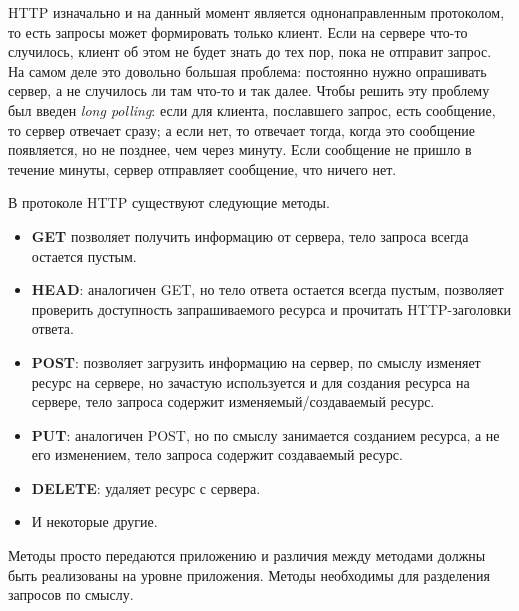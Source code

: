 HTTP изначально и на данный момент является однонаправленным протоколом, то есть запросы может формировать только клиент. Если на сервере что-то случилось, клиент об этом не будет знать до тех пор, пока не отправит запрос. На самом деле это довольно большая проблема: постоянно нужно опрашивать сервер, а не случилось ли там что-то и так далее.
Чтобы решить эту проблему был введен \emph{long polling}: если для клиента, пославшего запрос, есть сообщение, то сервер отвечает сразу; а если нет, то отвечает тогда, когда это сообщение появляется, но не позднее, чем через минуту. Если сообщение не пришло в течение минуты, сервер отправляет сообщение, что ничего нет.

В протоколе HTTP существуют следующие методы.
\begin{itemize}
  \item \textbf{GET} позволяет получить информацию от сервера, тело запроса всегда остается пустым.
  \item \textbf{HEAD}: аналогичен GET, но тело ответа остается всегда пустым, позволяет проверить доступность запрашиваемого ресурса и прочитать HTTP-заголовки ответа.
  \item \textbf{POST}: позволяет загрузить информацию на сервер, по смыслу изменяет ресурс на сервере, но зачастую используется и для создания ресурса на сервере, тело запроса содержит изменяемый/создаваемый ресурс.
  \item \textbf{PUT}: аналогичен POST, но по смыслу занимается созданием ресурса, а не его изменением, тело запроса содержит создаваемый ресурс.
  \item \textbf{DELETE}: удаляет ресурс с сервера.
  \item И некоторые другие.
\end{itemize}
Методы просто передаются приложению и различия между методами должны быть реализованы на уровне приложения. Методы необходимы для разделения запросов по смыслу.

